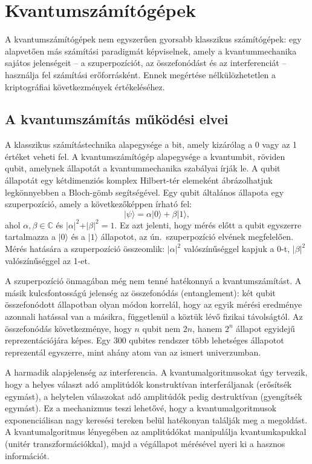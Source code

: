 \section{Kvantumszámítógépek}

A kvantumszámítógépek nem egyszerűen gyorsabb klasszikus számítógépek: egy alapvetően más számítási
paradigmát képviselnek, amely a kvantummechanika sajátos jelenségeit -- a szuperpozíciót, az
összefonódást és az interferenciát -- használja fel számítási erőforrásként. Ennek megértése
nélkülözhetetlen a kriptográfiai következmények értékeléséhez.

\subsection{A kvantumszámítás működési elvei}

A klasszikus számítástechnika alapegysége a bit, amely kizárólag a 0 vagy az 1 értéket veheti fel.
A kvantumszámítógép alapegysége a kvantumbit, röviden qubit, amelynek állapotát a kvantummechanika
szabályai írják le. A qubit állapotát egy kétdimenziós komplex Hilbert-tér elemeként ábrázolhatjuk legkönnyebben a Bloch-gömb segítségével. Egy qubit általános állapota egy szuperpozíció, amely a következőképpen írható fel:
$$\vert\psi\rangle = \alpha\vert 0\rangle + \beta\vert 1\rangle,$$
ahol $\alpha, \beta \in \mathbb{C}$ és $\vert\alpha\vert^2 + \vert\beta\vert^2 = 1$. Ez azt jelenti,
hogy mérés előtt a qubit egyszerre tartalmazza a $\vert 0\rangle$ és a $\vert 1\rangle$ állapotot,
az ún.\ szuperpozíció elvének megfelelően. Mérés hatására a szuperpozíció összeomlik: $\vert\alpha\vert^2$
valószínűséggel kapjuk a 0-t, $\vert\beta\vert^2$ valószínűséggel az 1-et.

A szuperpozíció önmagában még nem tenné hatékonnyá a kvantumszámítást. A másik kulcsfontosságú
jelenség az összefonódás (entanglement): két qubit összefonódott állapotban olyan módon korrelál,
hogy az egyik mérési eredménye azonnali hatással van a másikra, függetlenül a köztük lévő fizikai
távolságtól. Az összefonódás következménye, hogy $n$ qubit nem $2n$, hanem $2^n$ állapot egyidejű
reprezentációjára képes. Egy 300 qubites rendszer több lehetséges állapotot reprezentál egyszerre,
mint ahány atom van az ismert univerzumban.

A harmadik alapjelenség az interferencia. A kvantumalgoritmusokat úgy tervezik, hogy a helyes választ
adó amplitúdók konstruktívan interferáljanak (erősítsék egymást), a helytelen válaszokat adó
amplitúdók pedig destruktívan (gyengítsék egymást). Ez a mechanizmus teszi lehetővé, hogy a
kvantumalgoritmusok exponenciálisan nagy keresési tereken belül hatékonyan találják meg a megoldást.
A kvantumalgoritmus lényegében az amplitúdókat manipulálja kvantumkapukkal (unitér transzformációkkal),
majd a végállapot mérésével nyeri ki a hasznos információt.

